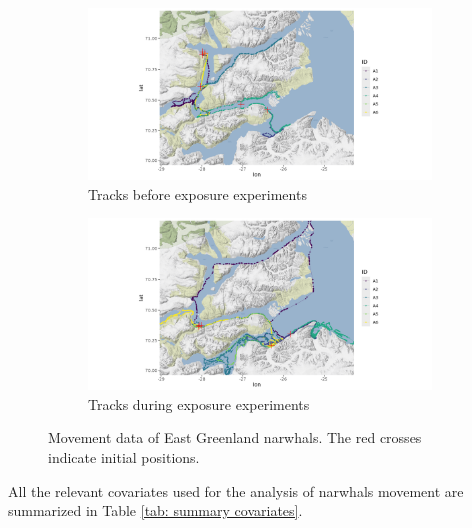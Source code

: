 \documentclass[aoas]{imsart}
\theoremstyle{definition}
\theoremstyle{remark}
\theoremstyle{remark}
\newcommand {\1}{\mathbb{1}}
\begin{document}
\begin{figure}[ht!]
	\centering
	\begin{subfigure}{0.8\linewidth}
		\centering
		\includegraphics[scale=0.5]{images/data_exploration/tracksBE2.png}
		\caption{Tracks before exposure experiments}
	\end{subfigure}

	\begin{subfigure}{0.8\linewidth}
		\centering
		\includegraphics[scale=0.5]{images/data_exploration/tracksAE.png}
		\caption{Tracks during exposure experiments}
	\end{subfigure}
	\caption{Movement data of East Greenland narwhals. The red crosses indicate initial positions.}
	\label{fig: tracks before and after exposure}
\end{figure}

All the relevant covariates   used for the analysis of narwhals movement are summarized in Table \ref{tab: summary covariates}.
\end{document}
